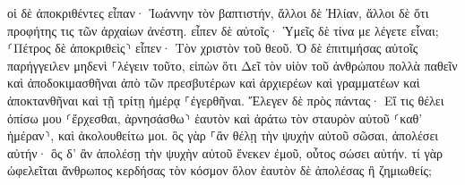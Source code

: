 \documentclass{openreader}
\begin{document}
οἱ δὲ ἀποκριθέντες εἶπαν· Ἰωάννην τὸν βαπτιστήν, ἄλλοι δὲ Ἠλίαν, ἄλλοι δὲ ὅτι προφήτης τις τῶν ἀρχαίων ἀνέστη. 
εἶπεν δὲ αὐτοῖς· Ὑμεῖς δὲ τίνα με λέγετε εἶναι; ⸂Πέτρος δὲ ἀποκριθεὶς⸃ εἶπεν· Τὸν χριστὸν τοῦ θεοῦ. 
Ὁ δὲ ἐπιτιμήσας αὐτοῖς παρήγγειλεν μηδενὶ ⸀λέγειν τοῦτο, 
εἰπὼν ὅτι Δεῖ τὸν υἱὸν τοῦ ἀνθρώπου πολλὰ παθεῖν καὶ ἀποδοκιμασθῆναι ἀπὸ τῶν πρεσβυτέρων καὶ ἀρχιερέων καὶ γραμματέων καὶ ἀποκτανθῆναι καὶ τῇ τρίτῃ ἡμέρᾳ ⸀ἐγερθῆναι. 
Ἔλεγεν δὲ πρὸς πάντας· Εἴ τις θέλει ὀπίσω μου ⸂ἔρχεσθαι, ἀρνησάσθω⸃ ἑαυτὸν καὶ ἀράτω τὸν σταυρὸν αὐτοῦ ⸂καθ’ ἡμέραν⸃, καὶ ἀκολουθείτω μοι. 
ὃς γὰρ ⸀ἂν θέλῃ τὴν ψυχὴν αὐτοῦ σῶσαι, ἀπολέσει αὐτήν· ὃς δ’ ἂν ἀπολέσῃ τὴν ψυχὴν αὐτοῦ ἕνεκεν ἐμοῦ, οὗτος σώσει αὐτήν. 
τί γὰρ ὠφελεῖται ἄνθρωπος κερδήσας τὸν κόσμον ὅλον ἑαυτὸν δὲ ἀπολέσας ἢ ζημιωθείς; 
\end{document}
